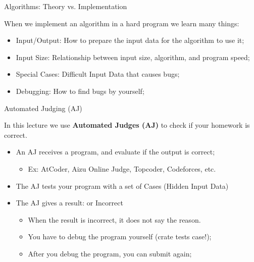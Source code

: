 \begin{frame}{Algorithms: Theory vs. Implementation}
  \begin{exampleblock}{}
    When we implement an algorithm in a hard program we learn many things:
  \end{exampleblock}
  \begin{itemize}
    \item \alert{Input/Output}: How to prepare the input data for the algorithm to use it;
    \item \alert{Input Size}: Relationship between input size, algorithm, and program speed;
    \item \alert{Special Cases}: Difficult Input Data that causes bugs;
    \item \alert{Debugging}: How to find bugs by yourself;
  \end{itemize}
\end{frame}

\begin{frame}{Automated Judging (AJ)}
  \begin{exampleblock}{}
  In this lecture we use {\bf Automated Judges (AJ)} to check if your homework is correct.
  \end{exampleblock}

  \begin{itemize}
  \item An AJ receives a program, and evaluate if the output is correct;
    \begin{itemize}
      \item Ex: AtCoder, Aizu Online Judge, Topcoder, Codeforces, etc.
    \end{itemize}\bigskip

    \item The AJ tests your program with a set of {\bfTest Cases} (Hidden Input Data)\bigskip

    \item The AJ gives a result:  or \alert{Incorrect}
    \begin{itemize}
      \item When the result is incorrect, \alert{it does not say the reason}.
      \item You have to debug the program yourself (crate tests case!);
      \item After you debug the program, you can submit again;
    \end{itemize}
  \end{itemize}
\end{frame}

